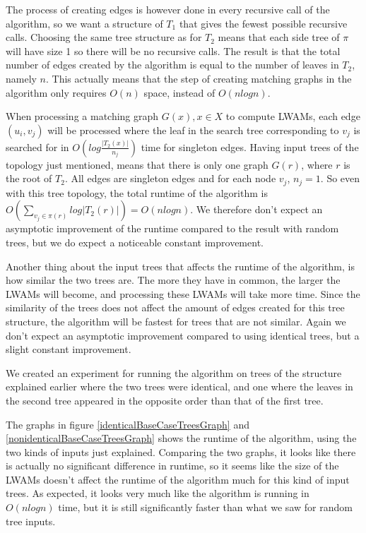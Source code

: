 The process of creating edges is however done in every recursive call of the algorithm, so we want a structure of $T_1$ that gives the fewest possible recursive calls. Choosing the same tree structure as for $T_2$ means that each side tree of $\pi$ will have size 1 so there will be no recursive calls. The result is that the total number of edges created by the algorithm is equal to the number of leaves in $T_2$, namely $n$. This actually means that the step of creating matching graphs in the algorithm only requires $O(n)$ space, instead of $O(nlogn)$.

When processing a matching graph $G(x), x \in X$ to compute LWAMs, each edge $(u_i, v_j)$ will be processed where the leaf in the search tree corresponding to $v_j$ is searched for in $O(log\frac{|T_2(x)|}{n_j})$ time for singleton edges. Having input trees of the topology just mentioned, means that there is only one graph $G(r)$, where $r$ is the root of $T_2$. All edges are singleton edges and for each node $v_j$, $n_j = 1$. So even with this tree topology, the total runtime of the algorithm is $O(\sum_{v_j \in \pi(r)} log |T_2(r)|) = O(nlogn)$. We therefore don't expect an asymptotic improvement of the runtime compared to the result with random trees, but we do expect a noticeable constant improvement.

Another thing about the input trees that affects the runtime of the algorithm, is how similar the two trees are. The more they have in common, the larger the LWAMs will become, and processing these LWAMs will take more time. Since the similarity of the trees does not affect the amount of edges created for this tree structure, the algorithm will be fastest for trees that are not similar. Again we don't expect an asymptotic improvement compared to using identical trees, but a slight constant improvement.

We created an experiment for running the algorithm on trees of the structure explained earlier where the two trees were identical, and one where the leaves in the second tree appeared in the opposite order than that of the first tree.

The graphs in figure \ref{identicalBaseCaseTreesGraph} and \ref{nonidenticalBaseCaseTreesGraph} shows the runtime of the algorithm, using the two kinds of inputs just explained. Comparing the two graphs, it looks like there is actually no significant difference in runtime, so it seems like the size of the LWAMs doesn't affect the runtime of the algorithm much for this kind of input trees. As expected, it looks very much like the algorithm is running in $O(nlogn)$ time, but it is still significantly faster than what we saw for random tree inputs.

